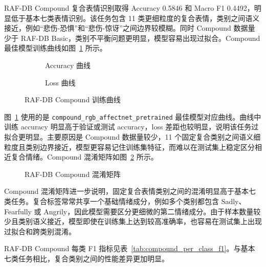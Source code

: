 \documentclass[UTF8,a4paper,12pt]{ctexart}
\newcommand{\code}[1]{\texttt{#1}}
\newcommand{\figplaceholder}[1]{%
  \begin{center}
    \fbox{\parbox{0.78\textwidth}{\centering #1}}
  \end{center}
}
\begin{document}
RAF-DB Compound 复合表情识别取得 Accuracy 0.5846 和 Macro F1 0.4492，明显低于基本七类表情识别。该任务包含 11 类更细粒度的复合表情，类别之间语义接近，例如“悲伤-恐惧”和“悲伤-惊讶”之间边界较模糊。同时 Compound 数据量少于 RAF-DB Basic，类别不平衡问题更明显，模型容易出现过拟合。Compound 最佳模型训练曲线如图~\ref{fig:compound_curves_in_results} 所示。

\begin{figure}[H]
  \centering
  \begin{subfigure}{0.48\textwidth}
    \centering
    \figplaceholder{\rule{0pt}{1.2em}}
    \caption{Accuracy 曲线}
  \end{subfigure}
  \hfill
  \begin{subfigure}{0.48\textwidth}
    \centering
    \figplaceholder{\rule{0pt}{1.2em}}
    \caption{Loss 曲线}
  \end{subfigure}
  \caption{RAF-DB Compound 训练曲线}
  \label{fig:compound_curves_in_results}
\end{figure}

图~\ref{fig:compound_curves_in_results} 使用的是 \code{compound\_rgb\_affectnet\_pretrained} 最佳模型对应曲线。曲线中训练 accuracy 明显高于验证或测试 accuracy，loss 差距也较明显，说明该任务过拟合更明显。主要原因是 Compound 数据量较少，11 个固定复合类别之间语义细粒度且类别边界接近，模型更容易记住训练集特征，而难以在测试集上稳定区分相近复合情绪。Compound 混淆矩阵如图~\ref{fig:compound_confusion_in_results} 所示。

\begin{figure}[H]
  \centering
  \figplaceholder{\rule{0pt}{1.2em}}
  \caption{RAF-DB Compound 混淆矩阵}
  \label{fig:compound_confusion_in_results}
\end{figure}

Compound 混淆矩阵进一步说明，固定复合表情类别之间的混淆明显高于基本七类任务。复合标签常常共享一个基础情绪成分，例如多个类别都包含 Sadly、Fearfully 或 Angrily，因此模型需要区分更细微的第二情绪成分。由于样本数量较少且类别语义接近，模型即使在训练集上达到较高准确率，也容易在测试集上出现过拟合和跨类别混淆。

RAF-DB Compound 每类 F1 指标见表~\ref{tab:compound_per_class_f1}。与基本七类任务相比，复合类别之间的性能差异更加明显。
\end{document}
